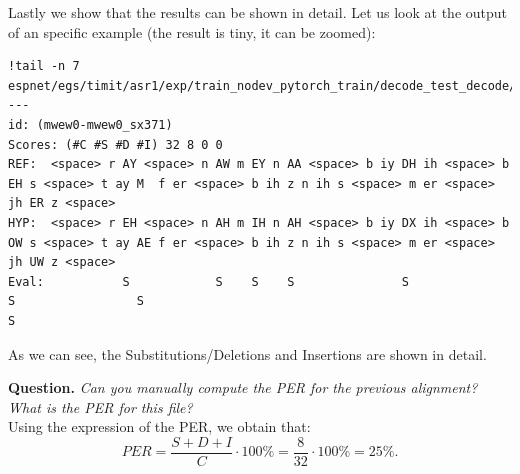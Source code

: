 \documentclass[a4paper]{article}
\begin{document}
Lastly we show that the results can be shown in detail. Let us look at the output of an specific example (the result is tiny, it can be zoomed):

\begin{verbatim}
!tail -n 7 espnet/egs/timit/asr1/exp/train_nodev_pytorch_train/decode_test_decode/result.txt
---
id: (mwew0-mwew0_sx371)
Scores: (#C #S #D #I) 32 8 0 0
REF:  <space> r AY <space> n AW m EY n AA <space> b iy DH ih <space> b EH s <space> t ay M  f er <space> b ih z n ih s <space> m er <space> jh ER z <space>
HYP:  <space> r EH <space> n AH m IH n AH <space> b iy DX ih <space> b OW s <space> t ay AE f er <space> b ih z n ih s <space> m er <space> jh UW z <space>
Eval:           S            S    S    S               S               S                 S                                                     S
\end{verbatim}
As we can see, the Substitutions/Deletions and Insertions are shown in detail.



\textbf{Question.} \emph{Can you manually compute the PER for the previous alignment? What is the PER for this file?}\\
Using the expression of the PER, we obtain that:
\[
PER = \frac{S+D+I}{C}\cdot 100\% = \frac{8}{32} \cdot 100\% = 25\%.
\]

\printbibliography
\end{document}
